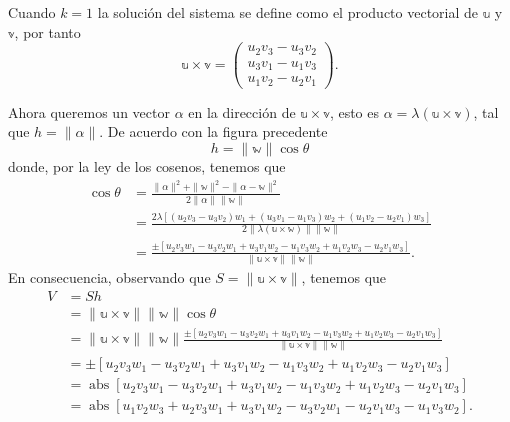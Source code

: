 Cuando $k=1$ la solución del sistema se define como el producto vectorial de $\mathbb{u}$ y $\mathbb{v}$, por tanto
$$\mathbb{u} \times \mathbb{v} = \begin{pmatrix}
    u_2 v_3-u_3 v_2 \\
    u_3 v_1-u_1 v_3 \\
    u_1 v_2-u_2 v_1
\end{pmatrix}.$$

Ahora queremos un vector $\alpha$ en la dirección de $\mathbb{u} \times \mathbb{v}$, esto es $\alpha=\lambda(\mathbb{u} \times \mathbb{v})$, tal que $h=\|\alpha\|$. De acuerdo con la figura precedente
$$ h=\| \mathbb{w} \| \cos \theta $$
donde, por la ley de los cosenos, tenemos que
$$ \begin{aligned} \cos \theta & =\frac{\|\alpha\|^2 + \| \mathbb{w} \|^2-\|\alpha - \mathbb{w} \|^2}{2 \|\alpha\| \| \mathbb{w} \|} \\ & =\frac{2 \lambda\left[\left(u_2 v_3-u_3 v_2\right) w_1+\left(u_3 v_1-u_1 v_3\right) w_2+\left(u_1 v_2-u_2 v_1\right) w_3\right]}{2\|\lambda(\mathbb{u} \times \mathbb{w})\| \| \mathbb{w} \|} \\ & =\frac{ \pm\left[u_2 v_3 w_1-u_3 v_2 w_1+u_3 v_1 w_2-u_1 v_3 w_2+u_1 v_2 w_3-u_2 v_1 w_3\right]}{\|\mathbb{u} \times \mathbb{v}\|\| \mathbb{w} \|} . \end{aligned} $$
En consecuencia, observando que $S=\|\mathbb{u} \times \mathbb{v}\|$, tenemos que
$$ \begin{aligned} V & =S h \\
    & =\|\mathbb{u} \times \mathbb{v}\|\| \mathbb{w} \| \cos \theta \\ 
    & =\|\mathbb{u} \times \mathbb{v}\|\| \mathbb{w} \| \frac{ \pm\left[u_2 v_3 w_1-u_3 v_2 w_1+u_3 v_1 w_2-u_1 v_3 w_2+u_1 v_2 w_3-u_2 v_1 w_3\right]}{\|\mathbb{u} \times \mathbb{v}\|\| \mathbb{w} \|} \\
    & = \pm\left[u_2 v_3 w_1-u_3 v_2 w_1+u_3 v_1 w_2-u_1 v_3 w_2+u_1 v_2 w_3-u_2 v_1 w_3\right] \\
    & = \operatorname{abs} \left[u_2 v_3 w_1-u_3 v_2 w_1+u_3 v_1 w_2-u_1 v_3 w_2+u_1 v_2 w_3-u_2 v_1 w_3\right] \\
    & =\operatorname{abs}\left[u_1 v_2 w_3+u_2 v_3 w_1+u_3 v_1 w_2-u_3 v_2 w_1-u_2 v_1 w_3-u_1 v_3 w_2\right]. \end{aligned}
$$

